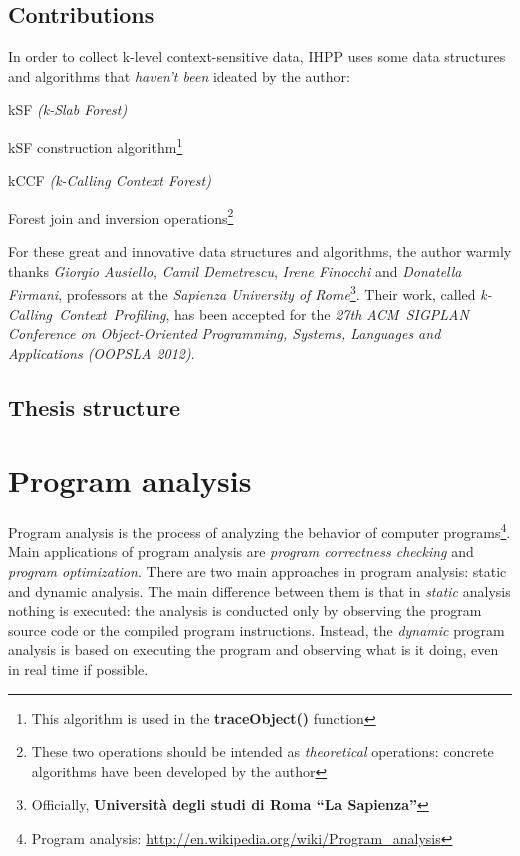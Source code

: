 \documentclass[a4paper,11pt]{report}
\begin{document}
\section{Contributions}

In order to collect k-level context-sensitive data, IHPP uses some data structures and algorithms that \emph{haven't been} ideated by the author:
\begin{itemize*}
\item kSF \emph{(k-Slab Forest)}
\item kSF construction algorithm\footnote{This algorithm is used in the \textbf{traceObject()} function}
\item kCCF \emph{(k-Calling Context Forest)}
\item Forest join and inversion operations\footnote{These two operations should be intended as \emph{theoretical} operations: concrete algorithms have been developed by the author}
\end{itemize*}

For these great and innovative data structures and algorithms, the author warmly thanks \emph{Giorgio Ausiello}, \emph{Camil Demetrescu}, \emph{Irene Finocchi} and \emph{Donatella Firmani}, professors at the \emph{Sapienza University of Rome}\footnote{Officially, \textbf{Universit\`a degli studi di Roma ``La Sapienza''}}. Their work, called \emph{\mbox{k-Calling Context Profiling}}, has been accepted for the \emph{27th \mbox{ACM SIGPLAN} Conference on Object-Oriented Programming, Systems, Languages and Applications (OOPSLA 2012)}.

\section{Thesis structure}

\chapter{Program analysis}

Program analysis is the process of analyzing the behavior of computer programs\footnote{Program analysis: \url{http://en.wikipedia.org/wiki/Program_analysis}}. Main applications of program analysis are \emph{program correctness checking} and \emph{program optimization}.
There are two main approaches in program analysis: static and dynamic analysis.
The main difference between them is that in \emph{static} analysis nothing is executed: the analysis
is conducted only by observing the program source code or the compiled program instructions. Instead, the \emph{dynamic} program analysis is based on executing the program and observing what is it doing, even in real time if possible.
\end{document}
